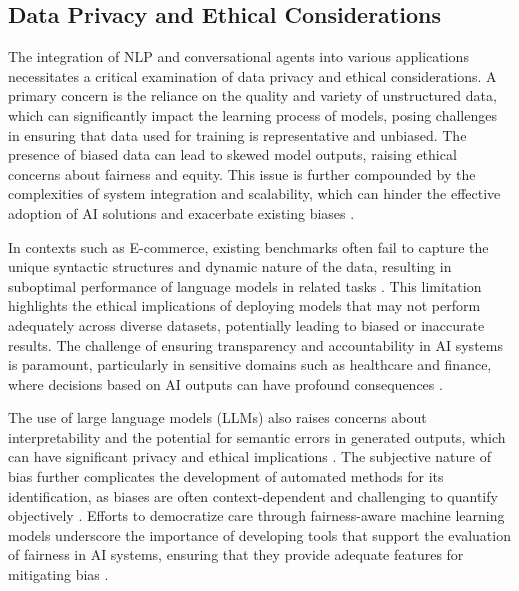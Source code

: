 \subsection{Data Privacy and Ethical Considerations} \label{subsec:Data Privacy and Ethical Considerations}

The integration of NLP and conversational agents into various applications necessitates a critical examination of data privacy and ethical considerations. A primary concern is the reliance on the quality and variety of unstructured data, which can significantly impact the learning process of models, posing challenges in ensuring that data used for training is representative and unbiased. The presence of biased data can lead to skewed model outputs, raising ethical concerns about fairness and equity. This issue is further compounded by the complexities of system integration and scalability, which can hinder the effective adoption of AI solutions and exacerbate existing biases \cite{pandy2024advancementsroboticsprocessautomation}.

In contexts such as E-commerce, existing benchmarks often fail to capture the unique syntactic structures and dynamic nature of the data, resulting in suboptimal performance of language models in related tasks \cite{bogoychev2020domaintranslationesenoisesynthetic}. This limitation highlights the ethical implications of deploying models that may not perform adequately across diverse datasets, potentially leading to biased or inaccurate results. The challenge of ensuring transparency and accountability in AI systems is paramount, particularly in sensitive domains such as healthcare and finance, where decisions based on AI outputs can have profound consequences \cite{zolfaghari2023surveyautomateddetectionclassification}.

The use of large language models (LLMs) also raises concerns about interpretability and the potential for semantic errors in generated outputs, which can have significant privacy and ethical implications \cite{lin2023interpretabilityframeworksimilarcase}. The subjective nature of bias further complicates the development of automated methods for its identification, as biases are often context-dependent and challenging to quantify objectively \cite{korre2023takesvillagemultidisciplinaritycollaboration}. Efforts to democratize care through fairness-aware machine learning models underscore the importance of developing tools that support the evaluation of fairness in AI systems, ensuring that they provide adequate features for mitigating bias \cite{chiaburu2024copronnconceptbasedprototypicalnearest}.

